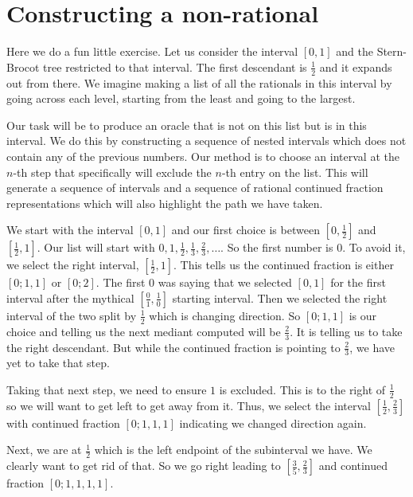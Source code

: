 \documentclass[12pt]{article}
\theoremstyle{remark}
\begin{document}
\medskip 

\appendix 

\section{Constructing a non-rational} \label{app:uncountable}

Here we do a fun little exercise. Let us consider the interval $[0,1]$ and the Stern-Brocot tree restricted to that interval. The first descendant is $\frac{1}{2}$ and it expands out from there. We imagine making a list of all the rationals in this interval by going across each level, starting from the least and going to the largest. 

Our task will be to produce an oracle that is not on this list but is in this interval. We do this by constructing a sequence of nested intervals which does not contain any of the previous numbers. Our method is to choose an interval at the $n$-th step that specifically will exclude the $n$-th entry on the list. This will generate a sequence of intervals and a sequence of rational continued fraction representations which will also highlight the path we have taken. 

We start with the interval $[0,1]$ and our first choice is between $[0,\frac{1}{2}]$ and $[\frac{1}{2}, 1]$. Our list will start with $0, 1, \frac{1}{2}, \frac{1}{3}, \frac{2}{3}, \ldots$. So the first number is $0$. To avoid it, we select the right interval, $[\frac{1}{2}, 1]$. This tells us the continued fraction is either $[0;1,1]$ or $[0;2]$. The first $0$ was saying that we selected $[0,1]$ for the first interval after the mythical $[\frac{0}{1}, \frac{1}{0}]$ starting interval. Then we selected the right interval of the two split by $\frac{1}{2}$ which is changing direction. So $[0;1,1]$ is our choice and telling us the next mediant computed will be $\frac{2}{3}$. It is telling us to take the right descendant. But while the continued fraction is pointing to $\frac{2}{3}$, we have yet to take that step. 

Taking that next step, we need to ensure $1$ is excluded. This is to the right of $\frac{1}{2}$ so we will want to get left to get away from it. Thus, we select the interval $[\frac{1}{2}, \frac{2}{3}]$ with continued fraction $[0;1,1,1]$ indicating we changed direction again. 

Next, we are at $\frac{1}{2}$ which is the left endpoint of the subinterval we have. We clearly want to get rid of that. So we go right leading to $[\frac{3}{5}, \frac{2}{3}]$ and continued fraction $[0; 1, 1, 1, 1]$. 
\end{document}
